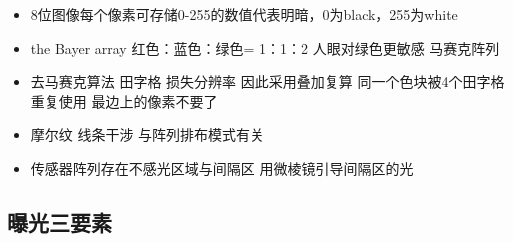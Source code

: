 \documentclass[
  letterpaper,
  DIV=11,
  numbers=noendperiod]{scrreprt}
\providecommand{\tightlist}{%
  \setlength{\itemsep}{0pt}\setlength{\parskip}{0pt}}\usepackage{longtable,booktabs,array}
\begin{document}
\begin{itemize}
\tightlist
\item
  8位图像每个像素可存储0-255的数值代表明暗，0为black，255为white
\item
  the Bayer array 红色：蓝色：绿色= 1：1：2 人眼对绿色更敏感 马赛克阵列
\item
  去马赛克算法 田字格 损失分辨率 因此采用叠加复算
  同一个色块被4个田字格重复使用 最边上的像素不要了
\item
  摩尔纹 线条干涉 与阵列排布模式有关
\item
  传感器阵列存在不感光区域与间隔区 用微棱镜引导间隔区的光
\end{itemize}

\subsection{曝光三要素}\label{ux66ddux5149ux4e09ux8981ux7d20}
\end{document}
